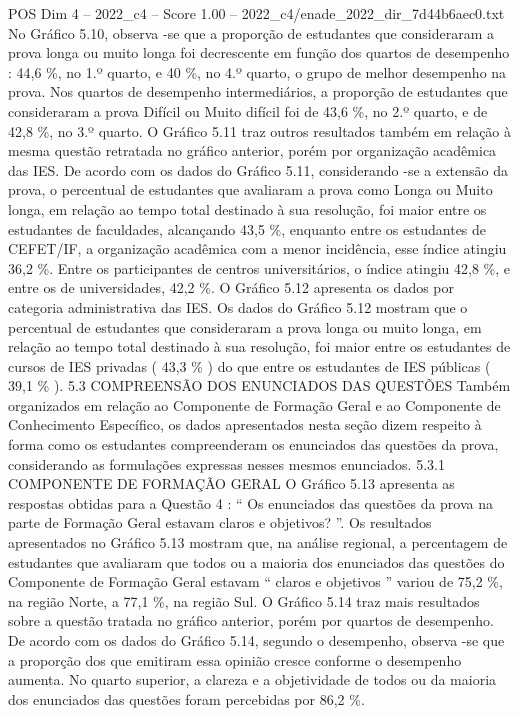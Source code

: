 \begin{textsample}{POS Dim 4 – 2022\_c4 – Score 1.00 – 2022\_c4/enade\_2022\_dir\_7d44b6aec0.txt}
No Gráfico 5.10, observa -se que a proporção de estudantes que consideraram a prova longa ou muito longa foi decrescente em função dos quartos de desempenho : 44,6 \%, no 1.º quarto, e 40 \%, no 4.º quarto, o grupo de melhor desempenho na prova.
Nos quartos de desempenho intermediários, a proporção de estudantes que consideraram a prova Difícil ou Muito difícil foi de 43,6 \%, no 2.º quarto, e de 42,8 \%, no 3.º quarto.
O Gráfico 5.11 traz outros resultados também em relação à mesma questão retratada no gráfico anterior, porém por organização acadêmica das IES.
De acordo com os dados do Gráfico 5.11, considerando -se a extensão da prova, o percentual de estudantes que avaliaram a prova como Longa ou Muito longa, em relação ao tempo total destinado à sua resolução, foi maior entre os estudantes de faculdades, alcançando 43,5 \%, enquanto entre os estudantes de CEFET/IF, a organização acadêmica com a menor incidência, esse índice atingiu 36,2 \%.
Entre os participantes de centros universitários, o índice atingiu 42,8 \%, e entre os de universidades, 42,2 \%.
O Gráfico 5.12 apresenta os dados por categoria administrativa das IES.
Os dados do Gráfico 5.12 mostram que o percentual de estudantes que consideraram a prova longa ou muito longa, em relação ao tempo total destinado à sua resolução, foi maior entre os estudantes de cursos de IES privadas ( 43,3 \% ) do que entre os estudantes de IES públicas ( 39,1 \% ). 5.3 COMPREENSÃO DOS ENUNCIADOS DAS QUESTÕES Também organizados em relação ao Componente de Formação Geral e ao Componente de Conhecimento Específico, os dados apresentados nesta seção dizem respeito à forma como os estudantes compreenderam os enunciados das questões da prova, considerando as formulações expressas nesses mesmos enunciados. 5.3.1 COMPONENTE DE FORMAÇÃO GERAL O Gráfico 5.13 apresenta as respostas obtidas para a Questão 4 : “ Os enunciados das questões da prova na parte de Formação Geral estavam claros e objetivos? ”.
Os resultados apresentados no Gráfico 5.13 mostram que, na análise regional, a percentagem de estudantes que avaliaram que todos ou a maioria dos enunciados das questões do Componente de Formação Geral estavam “ claros e objetivos ” variou de 75,2 \%, na região Norte, a 77,1 \%, na região Sul.
O Gráfico 5.14 traz mais resultados sobre a questão tratada no gráfico anterior, porém por quartos de desempenho.
De acordo com os dados do Gráfico 5.14, segundo o desempenho, observa -se que a proporção dos que emitiram essa opinião cresce conforme o desempenho aumenta.
No quarto superior, a clareza e a objetividade de todos ou da maioria dos enunciados das questões foram percebidas por 86,2 \%.

\end{textsample}
